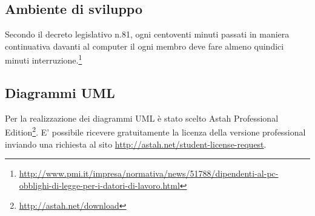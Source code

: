 \subsection{Ambiente di sviluppo}
Secondo il decreto legislativo n.81, ogni centoventi minuti passati in maniera continuativa davanti al computer il ogni membro deve fare almeno quindici minuti interruzione.\footnote{\url{http://www.pmi.it/impresa/normativa/news/51788/dipendenti-al-pc-obblighi-di-legge-per-i-datori-di-lavoro.html}}

\subsection{Diagrammi UML}

Per la realizzazione dei diagrammi \gls{UML} è stato scelto \gls{Astah} Professional Edition\footnote{\url{http://astah.net/download}}.
E' possibile ricevere gratuitamente la licenza della versione professional inviando una richiesta al sito \url{http://astah.net/student-license-request}.


